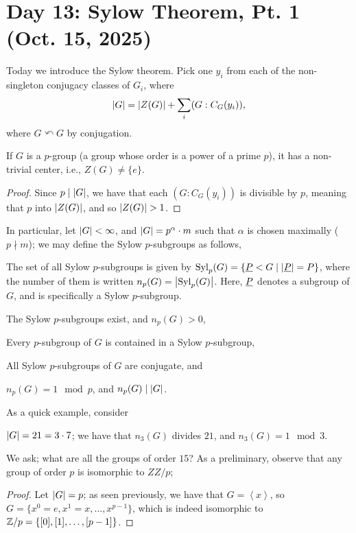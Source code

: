 \section{Day 13: Sylow Theorem, Pt. 1 (Oct. 15, 2025)}
Today we introduce the Sylow theorem. Pick one $y_i$ from each of the non-singleton conjugacy classes of $G_i$, where
\[ \left\lvert G \right\rvert = \left\lvert Z(G) \right\rvert + \sum_i (G : C_G(y_i)), \]
where $G \curvearrowleft G$ by conjugation.
\begin{corollary}
    If $G$ is a $p$-group (a group whose order is a power of a prime $p$), it has a non-trivial center, i.e., $Z(G) \neq \{e\}$.
\end{corollary}
\begin{proof}
    Since $p \mid \left\lvert G \right\rvert$, we have that each $(G : C_G(y_i))$ is divisible by $p$, meaning that $p$ into $\left\lvert Z(G) \right\rvert$, and so $\left\lvert Z(G) \right\rvert > 1$.
\end{proof}
\noindent In particular, let $\left\lvert G \right\rvert < \infty$, and $\left\lvert G \right\rvert = p^\alpha \cdot m$ such that $\alpha$ is chosen maximally ($p \nmid m$); we may define the Sylow $p$-subgroups as follows,
\begin{definition}
    The set of all Sylow $p$-subgroups is given by $\operatorname{Syl}_p(G) = \{\underline P < G \mid \left\lvert \underline P \right\rvert = P\}$, where the number of them is written $n_p(G) = \left\lvert \operatorname{Syl}_p(G) \right\rvert$. Here, $\underline P$ denotes a subgroup of $G$, and is specifically a Sylow $p$-subgroup.
\end{definition}
\begin{theorem}[Sylow]
    \begin{parlist}
        \item The Sylow $p$-subgroups exist, and $n_p(G) > 0$,
        \item Every $p$-subgroup of $G$ is contained in a Sylow $p$-subgroup,
        \item All Sylow $p$-subgroups of $G$ are conjugate, and
        \item $n_p(G) = 1 \mod p$, and $n_p(G) \mid \left\lvert G \right\rvert$.
    \end{parlist}
\end{theorem}
\noindent As a quick example, consider
\begin{example}
    $\left\lvert G \right\rvert = 21 = 3 \cdot 7$; we have that $n_3(G)$ divides $21$, and $n_3(G) = 1 \mod 3$.
\end{example}
\noindent We ask; what are all the groups of order $15$? As a preliminary, observe that any group of order $p$ is isomorphic to $ZZ/p$;
\begin{proof}
    Let $\left\lvert G \right\rvert = p$; as seen previously, we have that $G = \left<x\right>$, so $G = \{x^0 = e, x^1 = x, \dots, x^{p-1}\}$, which is indeed isomorphic to $\mathbb Z/p = \{[0], [1], \dots, [p-1]\}$. 
\end{proof}
